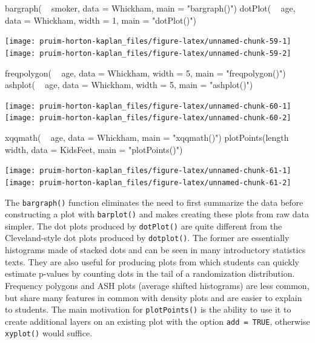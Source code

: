 \begin{Schunk}
\begin{Sinput}
bargraph( ~ smoker, data = Whickham, main = "bargraph()")
dotPlot( ~ age, data = Whickham, width = 1, main = "dotPlot()")
\end{Sinput}


\begin{center}\texttt{[image: pruim-horton-kaplan\_files/figure-latex/unnamed-chunk-59-1]} \texttt{[image: pruim-horton-kaplan\_files/figure-latex/unnamed-chunk-59-2]} \end{center}

\end{Schunk}\begin{Schunk}
\begin{Sinput}
freqpolygon( ~ age, data = Whickham, width = 5, main = "freqpolygon()")
ashplot( ~ age, data = Whickham, width = 5, main = "ashplot()")
\end{Sinput}


\begin{center}\texttt{[image: pruim-horton-kaplan\_files/figure-latex/unnamed-chunk-60-1]} \texttt{[image: pruim-horton-kaplan\_files/figure-latex/unnamed-chunk-60-2]} \end{center}

\end{Schunk}\begin{Schunk}
\begin{Sinput}
xqqmath( ~ age, data = Whickham, main = "xqqmath()")
plotPoints(length ~ width, data = KidsFeet, main = "plotPoints()")
\end{Sinput}


\begin{center}\texttt{[image: pruim-horton-kaplan\_files/figure-latex/unnamed-chunk-61-1]} \texttt{[image: pruim-horton-kaplan\_files/figure-latex/unnamed-chunk-61-2]} \end{center}

\end{Schunk}

The \texttt{bargraph()} function eliminates the need to first summarize
the data before constructing a plot with \texttt{barplot()} and makes
creating these plots from raw data simpler. The dot plots produced by
\texttt{dotPlot()} are quite different from the Cleveland-style dot
plots produced by \texttt{dotplot()}. The former are essentially
histograms made of stacked dots and can be seen in many introductory
statistics texts. They are also useful for producing plots from which
students can quickly estimate p-values by counting dots in the tail of a
randomization distribution. Frequency polygons and ASH plots (average
shifted histograms) are less common, but share many features in common
with density plots and are easier to explain to students. The main
motivation for \texttt{plotPoints()} is the ability to use it to create
additional layers on an existing plot with the option
\texttt{add\ =\ TRUE}, otherwise \texttt{xyplot()} would suffice.

